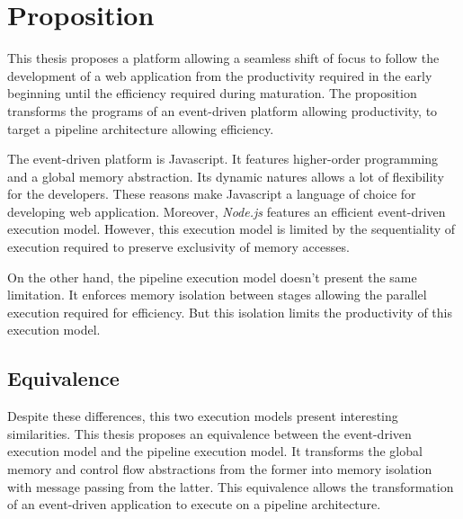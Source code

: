 \section{Proposition} \label{chapter4:proposition}

This thesis proposes a platform allowing a seamless shift of focus to follow the development of a web application from the productivity required in the early beginning until the efficiency required during maturation.
The proposition transforms the programs of an event-driven platform allowing productivity, to target a pipeline architecture allowing efficiency.

The event-driven platform is Javascript.
It features higher-order programming and a global memory abstraction.
Its dynamic natures allows a lot of flexibility for the developers.
These reasons make Javascript a language of choice for developing web application.
Moreover, \textit{Node.js} features an efficient event-driven execution model.
However, this execution model is limited by the sequentiality of execution required to preserve exclusivity of memory accesses.

On the other hand, the pipeline execution model doesn't present the same limitation.
It enforces memory isolation between stages allowing the parallel execution required for efficiency.
But this isolation limits the productivity of this execution model.

\subsection{Equivalence}

Despite these differences, this two execution models present interesting similarities.
This thesis proposes an equivalence between the event-driven execution model and the pipeline execution model.
It transforms the global memory and control flow abstractions from the former into memory isolation with message passing from the latter.
This equivalence allows the transformation of an event-driven application to execute on a pipeline architecture.

